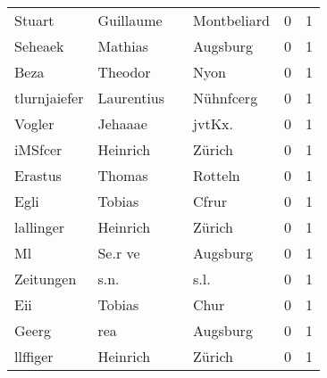 \begin{center}
\begin{tiny}
\begin{longtabu}{llllrr}
                   Stuart &                          Guillaume &             &                                 Montbeliard &          0 &         1 \\
                  Seheaek &                            Mathias &             &                                    Augsburg &          0 &         1 \\
                     Beza &                            Theodor &             &                                        Nyon &          0 &         1 \\
             tlurnjaiefer &                         Laurentius &             &                                   Nühnfcerg &          0 &         1 \\
                   Vogler &                            Jehaaae &             &                                     jvtKx.  &          0 &         1 \\
                  iMSfcer &                           Heinrich &             &                                      Zürich &          0 &         1 \\
                  Erastus &                             Thomas &             &                                     Rotteln &          0 &         1 \\
                     Egli &                             Tobias &             &                                       Cfrur &          0 &         1 \\
                lallinger &                           Heinrich &             &                                      Zürich &          0 &         1 \\
                       Ml &                            Se.r ve &             &                                    Augsburg &          0 &         1 \\
                Zeitungen &                               s.n. &             &                                        s.l. &          0 &         1 \\
                      Eii &                             Tobias &             &                                        Chur &          0 &         1 \\
                    Geerg &                                rea &             &                                    Augsburg &          0 &         1 \\
                 llffiger &                           Heinrich &             &                                      Zürich &          0 &         1 \\

\end{longtabu}
\end{tiny}
\end{center}
